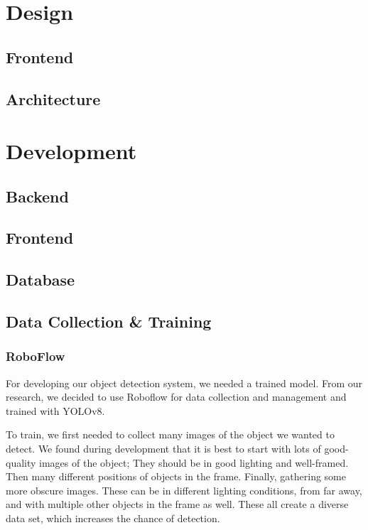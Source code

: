 \documentclass{article}
\begin{document}
    \section{Design}
    \subsection{Frontend}

    \subsection{Architecture}
  

    \section{Development}
    \subsection{Backend}

    \subsection{Frontend}
 
    \subsection{Database}

    \subsection{Data Collection \& Training}
    \subsubsection{RoboFlow}
    For developing our object detection system, we needed a trained model. From our research, we decided to use Roboflow for data collection and management and trained with YOLOv8.
    
To train, we first needed to collect many images of the object we wanted to detect. We found during development that it is best to start with lots of good-quality images of the object; They should be in good lighting and well-framed. Then many different positions of objects in the frame. Finally, gathering some more obscure images. These can be in different lighting conditions, from far away, and with multiple other objects in the frame as well. These all create a diverse data set, which increases the chance of detection.
\end{document}
